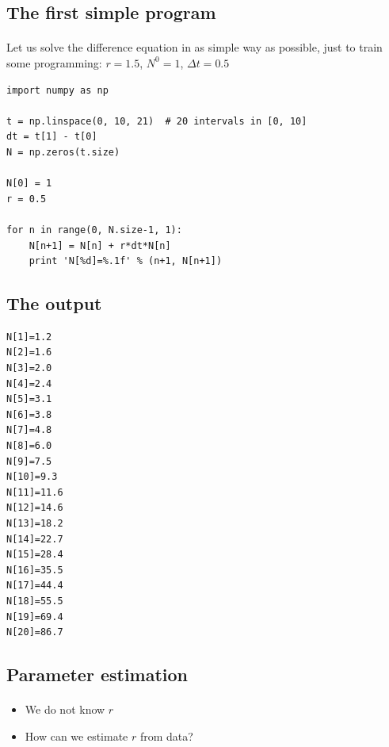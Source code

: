\documentclass[%
twoside,                 %
final,                   %
10pt]{article}
\begin{document}
\noindent



\subsection*{The first simple program}


\paragraph{}
Let us solve the difference equation in as simple way as possible,
just to train some programming: $r=1.5$, $N^0=1$, $\Delta t=0.5$

\begin{verbatim}
import numpy as np

t = np.linspace(0, 10, 21)  # 20 intervals in [0, 10]
dt = t[1] - t[0]
N = np.zeros(t.size)

N[0] = 1
r = 0.5

for n in range(0, N.size-1, 1):
    N[n+1] = N[n] + r*dt*N[n]
    print 'N[%d]=%.1f' % (n+1, N[n+1])
\end{verbatim}



\subsection*{The output}

\begin{Verbatim}[numbers=none,fontsize=\fontsize{9pt}{9pt},baselinestretch=0.95]
N[1]=1.2
N[2]=1.6
N[3]=2.0
N[4]=2.4
N[5]=3.1
N[6]=3.8
N[7]=4.8
N[8]=6.0
N[9]=7.5
N[10]=9.3
N[11]=11.6
N[12]=14.6
N[13]=18.2
N[14]=22.7
N[15]=28.4
N[16]=35.5
N[17]=44.4
N[18]=55.5
N[19]=69.4
N[20]=86.7
\end{Verbatim}

\subsection*{Parameter estimation}


\paragraph{}
\begin{itemize}
 \item We do not know $r$

 \item How can we estimate $r$ from data?
\end{itemize}
\end{document}
